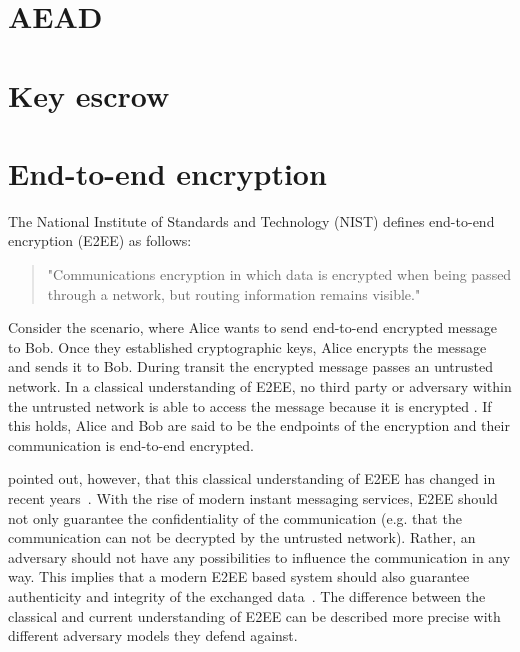 \documentclass[../main.tex]{subfiles}
\begin{document}
\section{AEAD}

\section{Key escrow}

\section{End-to-end encryption} \label{end-to-end}

The National Institute of Standards and Technology (NIST) defines end-to-end encryption (E2EE) as follows:
\begin{quote}
"Communications encryption in which data is encrypted when being passed through a network, but routing information remains visible."~\cite[88]{Nieles2017}
\end{quote}
Consider the scenario, where Alice wants to send end-to-end encrypted message to Bob.
Once they established cryptographic keys, Alice encrypts the message and sends it to Bob.
During transit the encrypted message passes an untrusted network.
In a classical understanding of E2EE, no third party or adversary within the untrusted network is able to access the message because it is encrypted \cite{Ermoshina2016}.
If this holds, Alice and Bob are said to be the endpoints of the encryption and their communication is end-to-end encrypted.

\citeauthor{Hale2022} pointed out, however, that this classical understanding of E2EE has changed in recent years~\cite{Hale2022}. 
With the rise of modern instant messaging services, E2EE should not only guarantee the confidentiality of the communication (e.g. that the communication can not be decrypted by the untrusted network).
Rather, an adversary should not have any possibilities to influence the communication in any way.
This implies that a modern E2EE based system should also guarantee authenticity and integrity of the exchanged data~\cite{Hale2022}. 
The difference between the classical and current understanding of E2EE can be described more precise with different adversary models they defend against.
\end{document}
